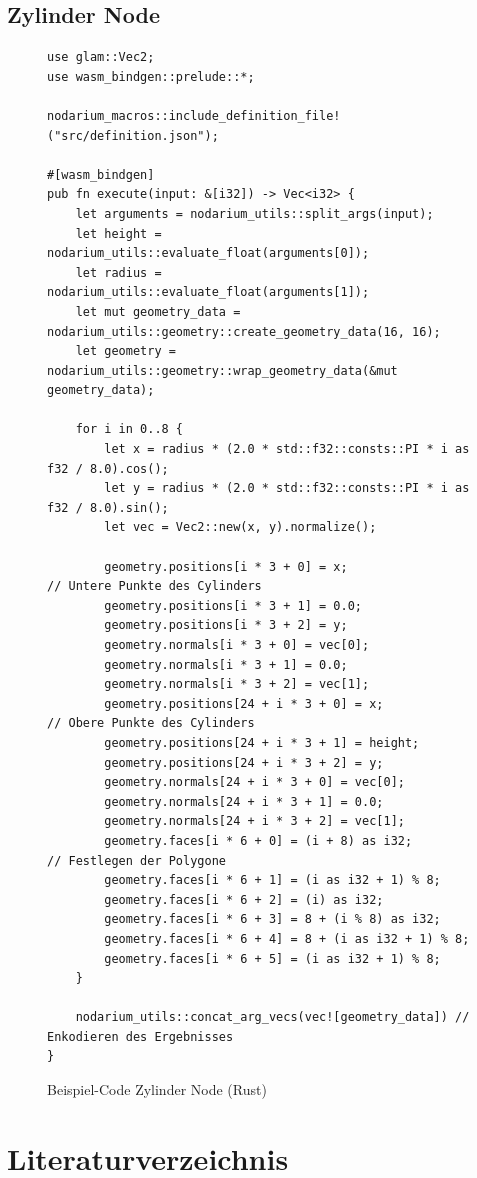 \documentclass[ngerman]{article}
\begin{document}
\subsection{Zylinder Node}
\label{sec:code_cylinder_node}
\begin{figure}[htbp]
  \fontsize{9}{11}
  \begin{code}
    \begin{verbatim}
use glam::Vec2;
use wasm_bindgen::prelude::*;

nodarium_macros::include_definition_file!("src/definition.json");

#[wasm_bindgen]
pub fn execute(input: &[i32]) -> Vec<i32> {
    let arguments = nodarium_utils::split_args(input);
    let height = nodarium_utils::evaluate_float(arguments[0]);
    let radius = nodarium_utils::evaluate_float(arguments[1]);
    let mut geometry_data = nodarium_utils::geometry::create_geometry_data(16, 16);
    let geometry = nodarium_utils::geometry::wrap_geometry_data(&mut geometry_data);

    for i in 0..8 {
        let x = radius * (2.0 * std::f32::consts::PI * i as f32 / 8.0).cos();
        let y = radius * (2.0 * std::f32::consts::PI * i as f32 / 8.0).sin();
        let vec = Vec2::new(x, y).normalize();

        geometry.positions[i * 3 + 0] = x;                // Untere Punkte des Cylinders
        geometry.positions[i * 3 + 1] = 0.0;
        geometry.positions[i * 3 + 2] = y;
        geometry.normals[i * 3 + 0] = vec[0];
        geometry.normals[i * 3 + 1] = 0.0;
        geometry.normals[i * 3 + 2] = vec[1];
        geometry.positions[24 + i * 3 + 0] = x;           // Obere Punkte des Cylinders
        geometry.positions[24 + i * 3 + 1] = height;
        geometry.positions[24 + i * 3 + 2] = y;
        geometry.normals[24 + i * 3 + 0] = vec[0];
        geometry.normals[24 + i * 3 + 1] = 0.0;
        geometry.normals[24 + i * 3 + 2] = vec[1];
        geometry.faces[i * 6 + 0] = (i + 8) as i32;       // Festlegen der Polygone
        geometry.faces[i * 6 + 1] = (i as i32 + 1) % 8;
        geometry.faces[i * 6 + 2] = (i) as i32;
        geometry.faces[i * 6 + 3] = 8 + (i % 8) as i32;
        geometry.faces[i * 6 + 4] = 8 + (i as i32 + 1) % 8;
        geometry.faces[i * 6 + 5] = (i as i32 + 1) % 8;
    }

    nodarium_utils::concat_arg_vecs(vec![geometry_data]) // Enkodieren des Ergebnisses
}
    \end{verbatim}
  \end{code}

  \caption{Beispiel-Code Zylinder Node (Rust)}

\end{figure}

\pagebreak
\section{Literaturverzeichnis}

\printbibliography
\end{document}
